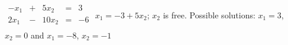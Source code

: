 {$\begin{array}{KQJQJ}
-x_1&+&5x_2&=&3\\
2x_1&-&10x_2&=&-6\\
\end{array}$}
{$x_1=-3+5x_2$; $x_2$ is free. Possible solutions: $x_1 = 3$, $x_2=0$ and $x_1 = -8$, $x_2 = -1$}
